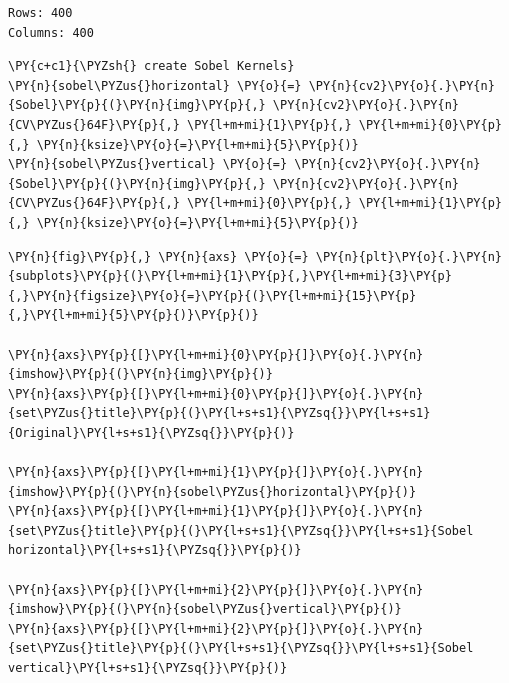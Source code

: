 \begin{Verbatim}[commandchars=\\\{\}]
Rows: 400
Columns: 400
\end{Verbatim}

\begin{tcolorbox}[breakable, size=fbox, boxrule=1pt, pad at break*=1mm,colback=cellbackground, colframe=cellborder]
	\begin{Verbatim}[commandchars=\\\{\}]
\PY{c+c1}{\PYZsh{} create Sobel Kernels}
\PY{n}{sobel\PYZus{}horizontal} \PY{o}{=} \PY{n}{cv2}\PY{o}{.}\PY{n}{Sobel}\PY{p}{(}\PY{n}{img}\PY{p}{,} \PY{n}{cv2}\PY{o}{.}\PY{n}{CV\PYZus{}64F}\PY{p}{,} \PY{l+m+mi}{1}\PY{p}{,} \PY{l+m+mi}{0}\PY{p}{,} \PY{n}{ksize}\PY{o}{=}\PY{l+m+mi}{5}\PY{p}{)}
\PY{n}{sobel\PYZus{}vertical} \PY{o}{=} \PY{n}{cv2}\PY{o}{.}\PY{n}{Sobel}\PY{p}{(}\PY{n}{img}\PY{p}{,} \PY{n}{cv2}\PY{o}{.}\PY{n}{CV\PYZus{}64F}\PY{p}{,} \PY{l+m+mi}{0}\PY{p}{,} \PY{l+m+mi}{1}\PY{p}{,} \PY{n}{ksize}\PY{o}{=}\PY{l+m+mi}{5}\PY{p}{)}
	\end{Verbatim}
\end{tcolorbox}

\begin{tcolorbox}[breakable, size=fbox, boxrule=1pt, pad at break*=1mm,colback=cellbackground, colframe=cellborder]
	\begin{Verbatim}[commandchars=\\\{\}]
\PY{n}{fig}\PY{p}{,} \PY{n}{axs} \PY{o}{=} \PY{n}{plt}\PY{o}{.}\PY{n}{subplots}\PY{p}{(}\PY{l+m+mi}{1}\PY{p}{,}\PY{l+m+mi}{3}\PY{p}{,}\PY{n}{figsize}\PY{o}{=}\PY{p}{(}\PY{l+m+mi}{15}\PY{p}{,}\PY{l+m+mi}{5}\PY{p}{)}\PY{p}{)}

\PY{n}{axs}\PY{p}{[}\PY{l+m+mi}{0}\PY{p}{]}\PY{o}{.}\PY{n}{imshow}\PY{p}{(}\PY{n}{img}\PY{p}{)}
\PY{n}{axs}\PY{p}{[}\PY{l+m+mi}{0}\PY{p}{]}\PY{o}{.}\PY{n}{set\PYZus{}title}\PY{p}{(}\PY{l+s+s1}{\PYZsq{}}\PY{l+s+s1}{Original}\PY{l+s+s1}{\PYZsq{}}\PY{p}{)}

\PY{n}{axs}\PY{p}{[}\PY{l+m+mi}{1}\PY{p}{]}\PY{o}{.}\PY{n}{imshow}\PY{p}{(}\PY{n}{sobel\PYZus{}horizontal}\PY{p}{)}
\PY{n}{axs}\PY{p}{[}\PY{l+m+mi}{1}\PY{p}{]}\PY{o}{.}\PY{n}{set\PYZus{}title}\PY{p}{(}\PY{l+s+s1}{\PYZsq{}}\PY{l+s+s1}{Sobel horizontal}\PY{l+s+s1}{\PYZsq{}}\PY{p}{)}

\PY{n}{axs}\PY{p}{[}\PY{l+m+mi}{2}\PY{p}{]}\PY{o}{.}\PY{n}{imshow}\PY{p}{(}\PY{n}{sobel\PYZus{}vertical}\PY{p}{)}
\PY{n}{axs}\PY{p}{[}\PY{l+m+mi}{2}\PY{p}{]}\PY{o}{.}\PY{n}{set\PYZus{}title}\PY{p}{(}\PY{l+s+s1}{\PYZsq{}}\PY{l+s+s1}{Sobel vertical}\PY{l+s+s1}{\PYZsq{}}\PY{p}{)}
	\end{Verbatim}
\end{tcolorbox}

